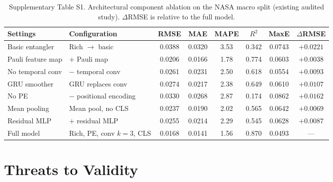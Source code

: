 \documentclass[a4paper,fleqn]{cas-sc}
\begin{document}
\begin{table}[t]
\centering
\small
\caption{Supplementary Table S1. Architectural component ablation on the NASA macro split (existing audited study). $\Delta$RMSE is relative to the full model.}\label{tab:s1_arch}\label{tab:nasa_ablation}
\begin{tabular}{@{}llcccccc@{}}
\toprule
Settings & Configuration & RMSE & MAE & MAPE & $R^2$ & MaxE & $\Delta$RMSE \\
\midrule
Basic entangler & Rich $\rightarrow$ basic & 0.0388 & 0.0320 & 3.53 & 0.342 & 0.0743 & $+0.0221$ \\
Pauli feature map & $+$ Pauli map & 0.0206 & 0.0166 & 1.78 & 0.774 & 0.0603 & $+0.0038$ \\
No temporal conv & $-$ temporal conv & 0.0261 & 0.0231 & 2.50 & 0.618 & 0.0554 & $+0.0093$ \\
GRU smoother & GRU replaces conv & 0.0274 & 0.0217 & 2.38 & 0.649 & 0.0610 & $+0.0107$ \\
No PE & $-$ positional encoding & 0.0330 & 0.0268 & 2.87 & 0.174 & 0.0862 & $+0.0162$ \\
Mean pooling & Mean pool, no CLS & 0.0237 & 0.0190 & 2.02 & 0.565 & 0.0642 & $+0.0069$ \\
Residual MLP & $+$ residual MLP & 0.0255 & 0.0214 & 2.29 & 0.545 & 0.0628 & $+0.0087$ \\
Full model & Rich, PE, conv $k{=}3$, CLS & 0.0168 & 0.0141 & 1.56 & 0.870 & 0.0493 & --- \\
\bottomrule
\end{tabular}
\end{table}

\section{Threats to Validity}\label{sec:threats}
\end{document}
